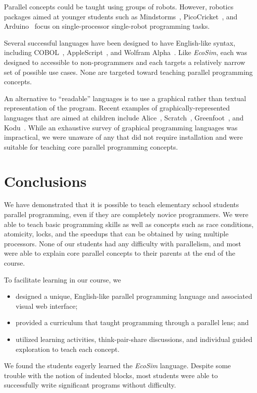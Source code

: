 \documentclass{sig-alternate}
\newcommand{\EcoSim}{\emph{EcoSim}}
\begin{document}
Parallel concepts could be taught using groups of robots.
However, robotics packages aimed at younger students
such as Mindstorms~\cite{Mindstorms}, Pico\-Cricket~\cite{Pico}, and Arduino~\cite{Arduino}
focus on single-processor single-robot programming tasks.


Several successful languages have been designed to have English-like syntax,
including COBOL~\cite{COBOL59}, AppleScript~\cite{AppleScript}, and Wolfram Alpha~\cite{WolframAlpha}.
Like \EcoSim{}, each was designed to accessible to non-programmers
and each targets a relatively narrow set of possible use cases.
None are targeted toward teaching parallel programming concepts.

An alternative to ``readable'' languages 
is to use a graphical rather than textual representation of the program.
Recent examples of graphically-represented languages that are aimed at children 
include Alice~\cite{Alice}, Scratch~\cite{Scratch}, Greenfoot~\cite{Greenfoot}, and Kodu~\cite{Kodu}.
While an exhaustive survey of graphical programming languages was impractical,
we were unaware of any that did not require installation
and were suitable for teaching core parallel programming concepts.



\section{Conclusions}
We have demonstrated that it is possible to teach elementary school students parallel programming,
even if they are completely novice programmers. 
We were able to teach basic programming skills as well as concepts such as race conditions, 
atomicity, locks, and the speedups that can be obtained by using multiple processors.
None of our students had any difficulty with parallelism, 
and most were able to explain core parallel concepts to their parents at the end of the course.

To facilitate learning in our course, we
\begin{itemize}\itemsep=0pt\parskip=0pt
\item designed a unique, English-like parallel programming language and associated visual web interface;
\item provided a curriculum that taught programming through a parallel lens; and
\item utilized learning activities, think-pair-share discussions, and individual guided exploration to teach each concept.
\end{itemize}
We found the students eagerly learned the \EcoSim{} language.
Despite some trouble with the notion of indented blocks,
most students were able to successfully write significant programs without difficulty.  
\end{document}
